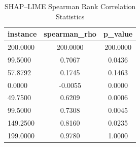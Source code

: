 \begin{table}
\centering
\caption{SHAP–LIME Spearman Rank Correlation Statistics}
\label{tab:agreement}
\begin{tabular}{lcc}
\toprule
instance & spearman_rho & p_value \\
\midrule
200.0000 & 200.0000 & 200.0000 \\
99.5000 & 0.7067 & 0.0436 \\
57.8792 & 0.1745 & 0.1463 \\
0.0000 & -0.0055 & 0.0000 \\
49.7500 & 0.6209 & 0.0006 \\
99.5000 & 0.7308 & 0.0045 \\
149.2500 & 0.8160 & 0.0235 \\
199.0000 & 0.9780 & 1.0000 \\
\bottomrule
\end{tabular}
\end{table}

